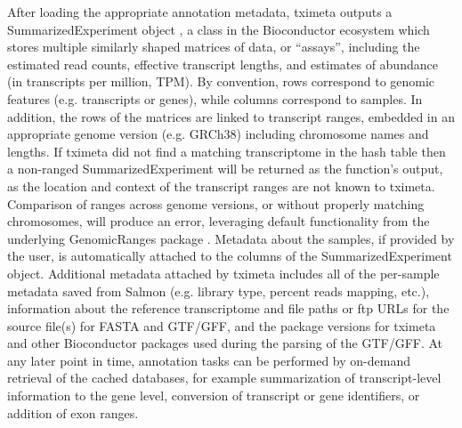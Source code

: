 \documentclass[12pt]{article} \usepackage[utf8]{inputenc}
\begin{document}
After loading the appropriate annotation metadata, tximeta outputs a
SummarizedExperiment object \citep{granges}, a class in the
Bioconductor ecosystem which stores multiple similarly shaped matrices
of data, or ``assays'', including the estimated read counts, effective
transcript lengths, and estimates of abundance (in transcripts per
million, TPM). By convention, rows correspond to genomic features
(e.g. transcripts or genes), while columns correspond to samples. In
addition, the rows of the matrices are linked to transcript ranges,
embedded in an appropriate genome version (e.g. GRCh38) including
chromosome names and lengths. If tximeta did not find a matching
transcriptome in the hash table then a non-ranged SummarizedExperiment
will be returned as the function's output, as the location and context
of the transcript ranges are not known to tximeta. Comparison of
ranges across genome versions, or without properly matching
chromosomes, will produce an error, leveraging default functionality
from the underlying GenomicRanges package \citep{granges}. Metadata
about the samples, if provided by the user, is automatically attached
to the columns of the SummarizedExperiment object. Additional metadata
attached by tximeta includes all of the per-sample metadata saved from
Salmon (e.g. library type, percent reads mapping, etc.), information
about the reference transcriptome and file paths or ftp URLs for the source file(s)
for FASTA and GTF/GFF, and the package versions for tximeta and other
Bioconductor packages used during the parsing of the GTF/GFF. At any
later point in time, annotation tasks can be performed by on-demand
retrieval of the cached databases, for example summarization of
transcript-level information to the gene level, conversion of
transcript or gene identifiers, or addition of exon ranges.
\end{document}
